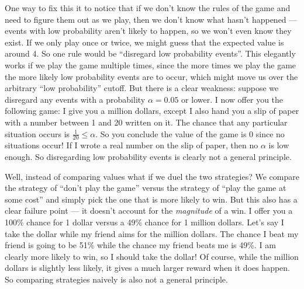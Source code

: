 \documentclass[11pt, oneside]{article}
\theoremstyle{plain}
\theoremstyle{definition}
\begin{document}
One way to fix this it to notice that if we don't know the rules of the
game and need to figure them out as we play, then we don't know what hasn't
happened --- events with low probability aren't likely to happen, so we
won't even know they exist. If we only play once or twice, we might guess
that the expected value is around 4. So one rule would be \enquote{disregard
low probability events}. This elegantly works if we play the game multiple
times, since the more times we play the game the more likely low probability
events are to occur, which might move us over the arbitrary \enquote{low
probability} cutoff. But there is a clear weakness: suppose we disregard
any events with a probability \( \alpha = 0.05 \) or lower. I now offer you
the following game: I give you a million dollars, except I also hand you a
slip of paper with a number between 1 and 20 written on it. The chance that
any particular situation occurs is \( \frac{1}{20} \leq \alpha \). So you
conclude the value of the game is 0 since no situations occur! If I wrote
a real number on the slip of paper, then no \( \alpha \) is low enough. So
disregarding low probability events is clearly not a general principle.

Well, instead of comparing values what if we duel the two strategies? We
compare the strategy of \enquote{don't play the game} versus the strategy of
\enquote{play the game at some cost} and simply pick the one that is more
likely to win. But this also has a clear failure point --- it doesn't account
for the \textit{magnitude} of a win. I offer you a 100\% chance for 1 dollar
versus a 49\% chance for 1 million dollars. Let's say I take the dollar while
my friend aims for the million dollars. The chance I beat my friend is going
to be 51\% while the chance my friend beats me is 49\%. I am clearly more
likely to win, so I should take the dollar! Of course, while the million
dollars is slightly less likely, it gives a much larger reward when it does
happen. So comparing strategies naively is also not a general principle.
\end{document}
